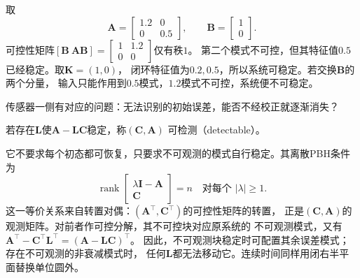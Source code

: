\begin{example}[不可控但可稳定的系统]
\label{ex:control-stabilizable-not-controllable}
取
\[
  \bm A=\begin{bmatrix}1.2&0\\0&0.5\end{bmatrix},
  \qquad \bm B=\begin{bmatrix}1\\0\end{bmatrix}.
\]
可控性矩阵$[\bm B\ \bm A\bm B]
=\left[\begin{smallmatrix}1&1.2\\0&0\end{smallmatrix}\right]$仅有秩$1$。
第二个模式不可控，但其特征值$0.5$已经稳定。取$\bm K=(1,0)$，
闭环特征值为$0.2,0.5$，所以系统可稳定。若交换$\bm B$的两个分量，
输入只能作用到$0.5$模式，$1.2$模式不可控，系统便不可稳定。
\end{example}

传感器一侧有对应的问题：无法识别的初始误差，能否不经校正就逐渐消失？
\begin{definition}[可检测性]
\label{def:control-detectability}
若存在$\bm L$使$\bm A-\bm L\bm C$稳定，称$(\bm C,\bm A)$
可检测（detectable）。
\end{definition}
它不要求每个初态都可恢复，只要求不可观测的模式自行稳定。其离散PBH条件为
\begin{equation}
  \operatorname{rank}
  \begin{bmatrix}\lambda\bm I-\bm A\\\bm C\end{bmatrix}=n
  \quad\text{对每个 }|\lambda|\geq1.
  \label{eq:control-pbh-detectability}
\end{equation}
这一等价关系来自转置对偶：$(\bm A^\top,\bm C^\top)$的可控性矩阵的转置，
正是$(\bm C,\bm A)$的观测矩阵。对前者作可控分解，其不可控块对应原系统的
不可观测模式，又有
$\bm A^\top-\bm C^\top\bm L^\top=(\bm A-\bm L\bm C)^\top$。
因此，不可观测块稳定时可配置其余误差模式；存在不可观测的非衰减模式时，
任何$\bm L$都无法移动它。连续时间同样用闭右半平面替换单位圆外。

